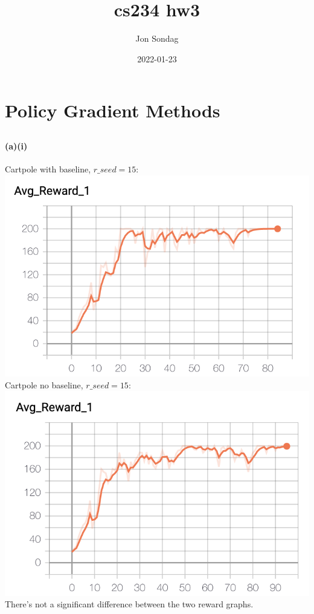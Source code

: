 \documentclass[10pt,a4paper]{article}
\title{cs234 hw3}
\date{2022-01-23}
\author{Jon Sondag}
\begin{document}
  \maketitle
  \section{Policy Gradient Methods}
  \setcounter{subsection}{4}  
  \subsection{}
  \paragraph{(a)(i)}
  Cartpole with baseline, $r\_seed=15$: \\
  \includegraphics[scale=0.5]{images/cartpole_baseline_15_avg_reward.png} \\
  Cartpole no baseline, $r\_seed=15$: \\
  \includegraphics[scale=0.5]{images/cartpole_nobaseline_15_avg_reward.png} \\
  There's not a significant difference between the two reward graphs.
\end{document}
